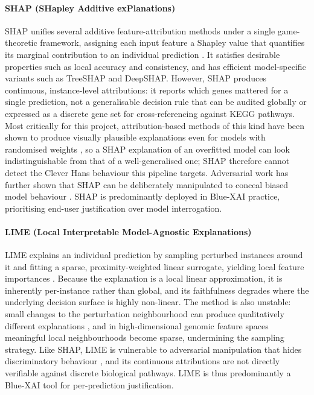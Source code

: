 {\color{red}

\paragraph{SHAP (SHapley Additive exPlanations)}
SHAP unifies several additive feature-attribution methods under a single game-theoretic
framework, assigning each input feature a Shapley value that quantifies its marginal contribution
to an individual prediction \cite{Lundberg2017}. It satisfies desirable properties such as local
accuracy and consistency, and has efficient model-specific variants such as TreeSHAP and DeepSHAP.
However, SHAP produces continuous, instance-level attributions: it reports which genes mattered for
a single prediction, not a generalisable decision rule that can be audited globally or expressed as
a discrete gene set for cross-referencing against KEGG pathways. Most critically for this project,
attribution-based methods of this kind have been shown to produce visually plausible explanations
even for models with randomised weights \cite{Adebayo2018}, so a SHAP explanation of an overfitted
model can look indistinguishable from that of a well-generalised one; SHAP therefore cannot detect
the Clever Hans behaviour this pipeline targets. Adversarial work has further shown that SHAP can be
deliberately manipulated to conceal biased model behaviour \cite{Slack2020}. SHAP is predominantly
deployed in Blue-XAI practice, prioritising end-user justification over model interrogation.

\paragraph{LIME (Local Interpretable Model-Agnostic Explanations)}
LIME explains an individual prediction by sampling perturbed instances around it and fitting a
sparse, proximity-weighted linear surrogate, yielding local feature importances \cite{Ribeiro2016}.
Because the explanation is a local linear approximation, it is inherently per-instance rather than
global, and its faithfulness degrades where the underlying decision surface is highly non-linear.
The method is also unstable: small changes to the perturbation neighbourhood can produce
qualitatively different explanations \cite{AlvarezMelis2018}, and in high-dimensional genomic
feature spaces meaningful local neighbourhoods become sparse, undermining the sampling strategy.
Like SHAP, LIME is vulnerable to adversarial manipulation that hides discriminatory behaviour
\cite{Slack2020}, and its continuous attributions are not directly verifiable against discrete
biological pathways. LIME is thus predominantly a Blue-XAI tool for per-prediction justification.

}
